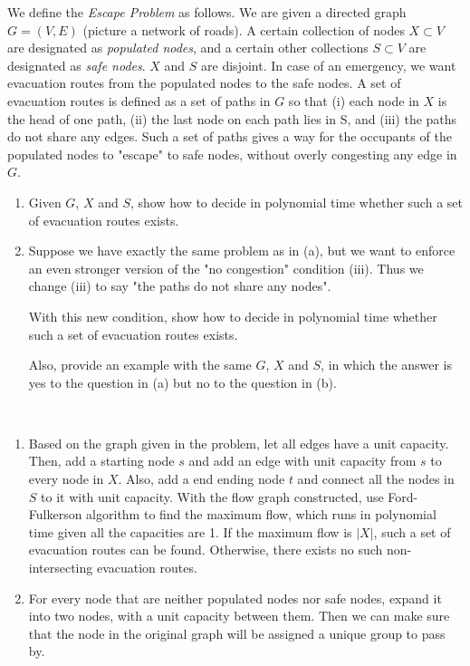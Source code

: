 \begin{exercise}[]{We define the \textit{Escape Problem} as follows. We are given a directed graph $G=(V,E)$ (picture a network of roads). A certain collection of nodes $X \subset V$ are designated as \textit{populated nodes}, and a certain other collections $S \subset V$ are designated as \textit{safe nodes}. $X$ and $S$ are disjoint. In case of an emergency, we want evacuation routes from the populated nodes to the safe nodes. A set of evacuation routes is defined as a set of paths in $G$ so that (i) each node in $X$ is the head of one path, (ii) the last node on each path lies in S, and (iii) the paths do not share any edges. Such a set of paths gives a way for the occupants of the populated nodes to "escape" to safe nodes, without overly congesting any edge in $G$.

    \begin{enumerate}
        \item Given $G$, $X$ and $S$, show how to decide in polynomial time whether such a set of evacuation routes exists.
        \item Suppose we have exactly the same problem as in (a), but we want to enforce an even stronger version of the "no congestion" condition (iii). Thus we change (iii) to say "the paths do not share any nodes". 
        
        With this new condition, show how to decide in polynomial time whether such a set of evacuation routes exists. 
        
        Also, provide an example with the same $G$, $X$ and $S$, in which the answer is yes to the question in (a) but no to the question in (b).
    \end{enumerate}
    }
  \begin{solution}
  \par{~}
  \begin{enumerate}
    \item Based on the graph given in the problem, let all edges have a unit capacity. Then, add a starting node $s$ and add an edge with unit capacity from $s$ to every node in $X$. Also, add a end ending node $t$ and connect all the nodes in $S$ to it with unit capacity. With the flow graph constructed, use Ford-Fulkerson algorithm to find the maximum flow, which runs in polynomial time given all the capacities are 1. If the maximum flow is $|X|$, such a set of evacuation routes can be found. Otherwise, there exists no such non-intersecting evacuation routes.
    \item For every node that are neither populated nodes nor safe nodes, expand it into two nodes, with a unit capacity between them. Then we can make sure that the node in the original graph will be assigned a unique group to pass by.
    

\end{enumerate}
\end{solution}
\end{exercise}
